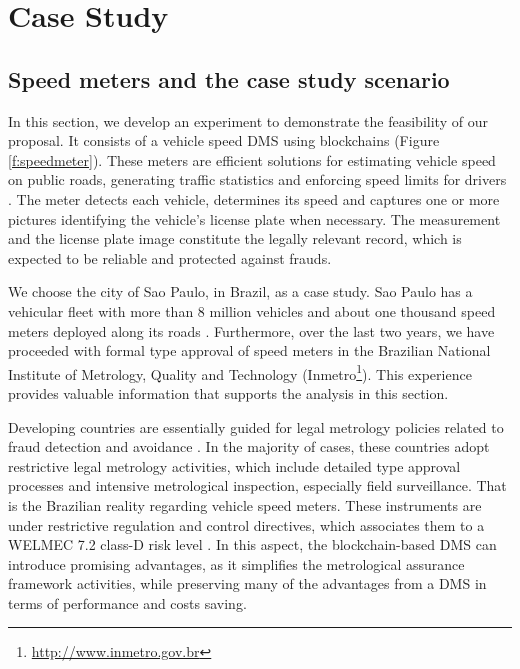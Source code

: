 \documentclass[journal]{IEEEtran}
\begin{document}
\section{Case Study}
\subsection{Speed meters and the case study scenario}
In this section, we develop an experiment to demonstrate the feasibility of our proposal.
It consists of a vehicle speed DMS using blockchains (Figure \ref{f:speedmeter}).
These meters are efficient solutions for estimating vehicle speed on public roads, generating traffic statistics and enforcing speed limits for drivers \cite{Ki2006,S2011}.
The meter detects each vehicle, determines its speed and captures one or more pictures identifying the vehicle's license plate when necessary.
The measurement and the license plate image constitute the legally relevant record, which is expected to be reliable and protected against frauds.

We choose the city of Sao Paulo, in Brazil, as a case study.
Sao Paulo has a vehicular fleet with more than 8 million vehicles and about one thousand speed meters deployed along its roads \cite{CompanhiadeEngenhariadeTrafego-CET2017}.
Furthermore, over the last two years, we have proceeded with formal type approval of speed meters in the Brazilian National Institute of Metrology, Quality and Technology (Inmetro\footnote{\url{http://www.inmetro.gov.br}}).
This experience provides valuable information that supports the analysis in this section.  

Developing countries are essentially guided for legal metrology policies related to fraud detection and avoidance \cite{RodriguesFilho2015,Camara2012,Luchsinger2008}.
In the majority of cases, these countries adopt restrictive legal metrology activities, which include detailed type approval processes and intensive metrological inspection, especially field surveillance.
That is the Brazilian reality regarding vehicle speed meters.
These instruments are under restrictive regulation and control directives, which associates them to a WELMEC 7.2 class-D risk level \cite{EuropeanCooperationinLegalMetrologyWELMEC2015}.
In this aspect, the blockchain-based DMS can introduce promising advantages, as it simplifies the metrological assurance framework activities, while preserving many of the advantages from a DMS in terms of performance and costs saving.
\end{document}
